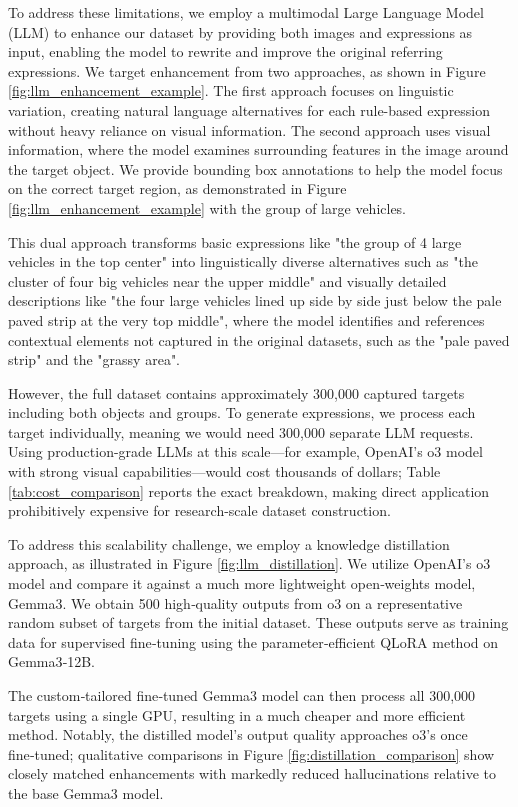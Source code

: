 To address these limitations, we employ a multimodal Large Language Model (LLM) to enhance our dataset by providing both images and expressions as input, enabling the model to rewrite and improve the original referring expressions. We target enhancement from two approaches, as shown in Figure \ref{fig:llm_enhancement_example}. The first approach focuses on linguistic variation, creating natural language alternatives for each rule-based expression without heavy reliance on visual information. The second approach uses visual information, where the model examines surrounding features in the image around the target object. We provide bounding box annotations to help the model focus on the correct target region, as demonstrated in Figure \ref{fig:llm_enhancement_example} with the group of large vehicles.

This dual approach transforms basic expressions like "the group of 4 large vehicles in the top center" into linguistically diverse alternatives such as "the cluster of four big vehicles near the upper middle" and visually detailed descriptions like "the four large vehicles lined up side by side just below the pale paved strip at the very top middle", where the model identifies and references contextual elements not captured in the original datasets, such as the "pale paved strip" and the "grassy area".

However, the full dataset contains approximately 300,000 captured targets including both objects and groups. To generate expressions, we process each target individually, meaning we would need 300,000 separate LLM requests. Using production-grade LLMs at this scale—for example, OpenAI’s o3 model\cite{o3} with strong visual capabilities—would cost thousands of dollars; Table \ref{tab:cost_comparison} reports the exact breakdown, making direct application prohibitively expensive for research-scale dataset construction.

To address this scalability challenge, we employ a knowledge distillation approach, as illustrated in Figure \ref{fig:llm_distillation}. We utilize OpenAI’s o3 model\cite{o3} and compare it against a much more lightweight open‑weights model, Gemma3\cite{gemma3}. We obtain 500 high‑quality outputs from o3 on a representative random subset of targets from the initial dataset. These outputs serve as training data for supervised fine‑tuning using the parameter‑efficient QLoRA method\cite{qlora} on Gemma3‑12B.

The custom‑tailored fine‑tuned Gemma3 model can then process all 300,000 targets using a single GPU, resulting in a much cheaper and more efficient method. Notably, the distilled model’s output quality approaches o3’s once fine‑tuned; qualitative comparisons in Figure \ref{fig:distillation_comparison} show closely matched enhancements with markedly reduced hallucinations relative to the base Gemma3 model.

